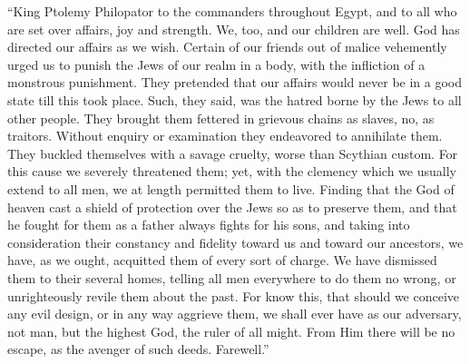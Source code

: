  ``King Ptolemy Philopator to the commanders throughout
Egypt, and to all who are set over affairs, joy and strength.
 We, too, and our children are well. God has directed our
affairs as we wish.  Certain of our friends out of malice
vehemently urged us to punish the Jews of our realm in a body, with the
infliction of a monstrous punishment.  They pretended that
our affairs would never be in a good state till this took place. Such,
they said, was the hatred borne by the Jews to all other people.
 They brought them fettered in grievous chains as slaves,
no, as traitors. Without enquiry or examination they endeavored to
annihilate them. They buckled themselves with a savage cruelty, worse
than Scythian custom.  For this cause we severely threatened
them; yet, with the clemency which we usually extend to all men, we at
length permitted them to live. Finding that the God of heaven cast a
shield of protection over the Jews so as to preserve them, and that he
fought for them as a father always fights for his sons,  and
taking into consideration their constancy and fidelity toward us and
toward our ancestors, we have, as we ought, acquitted them of every sort
of charge.  We have dismissed them to their several homes,
telling all men everywhere to do them no wrong, or unrighteously revile
them about the past.  For know this, that should we conceive
any evil design, or in any way aggrieve them, we shall ever have as our
adversary, not man, but the highest God, the ruler of all might. From
Him there will be no escape, as the avenger of such deeds. Farewell.''


